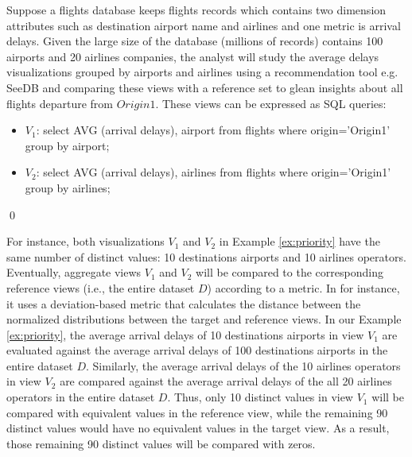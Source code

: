 \begin{example}
\label{ex:priority}
Suppose a flights database  keeps flights records which contains two
dimension attributes such as destination airport name and airlines and one
metric is arrival delays. Given the large size of the database
(millions of records) contains 100 airports and 20 airlines
companies, the analyst will study the average delays
visualizations grouped by airports and airlines using a recommendation tool e.g. SeeDB and comparing
these views with a reference set to glean insights about all flights
departure from $Origin1$.
%
These views can be expressed as SQL queries:
\footnotesize
\begin{itemize}
\item $V_1$: select AVG (arrival delays), airport from flights where origin='Origin1'  group by airport;
\item $V_2$: select AVG (arrival delays), airlines from flights where origin='Origin1' group by airlines;
\end{itemize}
%
\qed
\end{example}
%
For instance, both visualizations $V_1$ and $V_2$ in Example \ref{ex:priority} have the same number of distinct values: 10 
destinations airports and 10 airlines operators.
%
Eventually, aggregate views $V_1$ and $V_2$ will be compared to the corresponding reference views (i.e., the entire dataset $D$) according to a metric.
%
In \cite{DBLP:journals/pvldb/VartakMPP14} for instance, it uses a deviation-based metric that 
calculates the distance between the normalized distributions between the target and reference views. 
%
In our Example \ref{ex:priority}, the average arrival delays of 10 destinations airports in view $V_1$ are evaluated against the average arrival delays of 100 destinations airports 
in the entire dataset $D$.
%
Similarly, the average arrival delays of the 10 airlines operators in view $V_2$ are compared against the average arrival delays of the all 20 airlines operators in the entire dataset $D$.
Thus, only 10 distinct values in view $V_1$ will be compared with equivalent values in the reference view, while the remaining 90 distinct values would have no equivalent values in the target view.
%
As a result, those remaining 90 distinct values will be compared with zeros.
% 

